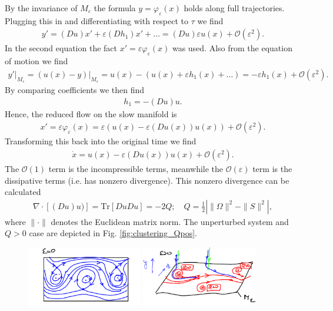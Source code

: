 \begin{ex}
By the invariance of $M_{\varepsilon}$ the formula $y=\varphi_{\varepsilon}(x)$ holds along full trajectories. Plugging this in and differentiating with respect to $\tau$ we find
\begin{align}
	y' = (Du)x' + \varepsilon (Dh_{1})x' + \ldots = (Du) \varepsilon u(x) + \mathcal{O}(\varepsilon^{2}).
\end{align}
In the second equation the fact $x'=\varepsilon \varphi_{\varepsilon}(x)$ was used. Also from the equation of motion we find
\begin{align}
	\left. y'\right|_{M_{\varepsilon}} = \left. \left(u(x) - y\right) \right|_{M_{\varepsilon}} = u(x) - \left(u(x) + \varepsilon h_{1}(x) + \ldots\right) = - \varepsilon h_{1}(x) + \mathcal{O}(\varepsilon^{2}).
\end{align}
By comparing coefficients we then find
\begin{align}
	h_{1} = - (Du)u.
\end{align}
Hence, the reduced flow on the slow manifold is
\begin{align}
	x' = \varepsilon \varphi_{\varepsilon}(x) = \varepsilon \left( u(x) - \varepsilon (Du(x)) u(x) \right) + \mathcal{O}(\varepsilon^{2}).
\end{align}
Transforming this back into the original time we find
\begin{align}
	\dot{x} = u(x) - \varepsilon (Du(x))u(x) + \mathcal{O}(\varepsilon^{2}).
\end{align}
The $\mathcal{O}(1)$ term is the incompressible terms, meanwhile the $\mathcal{O}(\varepsilon)$ term is the dissipative terms (i.e. has nonzero divergence). This nonzero divergence can be calculated
\begin{align}
	\nabla \cdot \left[ (Du)u) \right] =  \textrm{Tr} \left[ Du Du\right] = - 2Q;\quad Q = \frac{1}{2}\left| \|\Omega\|^{2} - \| S\|^{2} \right|,
\end{align}
where $\| \cdot \|$ denotes the Euclidean matrix norm. The unperturbed system and $Q>0$ case are depicted in Fig. \ref{fig:clustering_Qpos}.
\begin{figure}[h!]
	\centering
	\includegraphics[width=0.45\textwidth]{figures/ch9/23a_Qpos_clustering.png}
	\includegraphics[width=0.45\textwidth]{figures/ch9/23b_Qpos_clustering.png}

\end{figure}
\end{ex}
